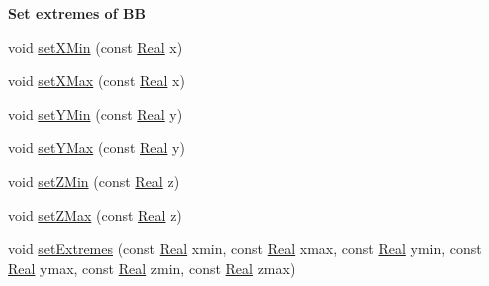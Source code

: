 \begin{Indent}{\bf Set extremes of BB}\par
\begin{DoxyCompactItemize}
\item 
void \hyperlink{classFVCode3D_1_1BoundingBox_a144cba8efab6a5aa39f70ec23e766d91}{set\+X\+Min} (const \hyperlink{namespaceFVCode3D_a40c1f5588a248569d80aa5f867080e83}{Real} x)
\item 
void \hyperlink{classFVCode3D_1_1BoundingBox_a78915347964e18dbc5e682a2f49e17c0}{set\+X\+Max} (const \hyperlink{namespaceFVCode3D_a40c1f5588a248569d80aa5f867080e83}{Real} x)
\item 
void \hyperlink{classFVCode3D_1_1BoundingBox_a737ffbfd6172701e115e4a09c4c2f794}{set\+Y\+Min} (const \hyperlink{namespaceFVCode3D_a40c1f5588a248569d80aa5f867080e83}{Real} y)
\item 
void \hyperlink{classFVCode3D_1_1BoundingBox_a6c94c8a20c124bbbbb930d674e9bbcee}{set\+Y\+Max} (const \hyperlink{namespaceFVCode3D_a40c1f5588a248569d80aa5f867080e83}{Real} y)
\item 
void \hyperlink{classFVCode3D_1_1BoundingBox_a0baed9e5d4512d22919cbe9758094c1a}{set\+Z\+Min} (const \hyperlink{namespaceFVCode3D_a40c1f5588a248569d80aa5f867080e83}{Real} z)
\item 
void \hyperlink{classFVCode3D_1_1BoundingBox_a3d1999833038d557cb89b56b35601593}{set\+Z\+Max} (const \hyperlink{namespaceFVCode3D_a40c1f5588a248569d80aa5f867080e83}{Real} z)
\item 
void \hyperlink{classFVCode3D_1_1BoundingBox_a8a1df0623c373b7a2c887e24d1fe298a}{set\+Extremes} (const \hyperlink{namespaceFVCode3D_a40c1f5588a248569d80aa5f867080e83}{Real} xmin, const \hyperlink{namespaceFVCode3D_a40c1f5588a248569d80aa5f867080e83}{Real} xmax, const \hyperlink{namespaceFVCode3D_a40c1f5588a248569d80aa5f867080e83}{Real} ymin, const \hyperlink{namespaceFVCode3D_a40c1f5588a248569d80aa5f867080e83}{Real} ymax, const \hyperlink{namespaceFVCode3D_a40c1f5588a248569d80aa5f867080e83}{Real} zmin, const \hyperlink{namespaceFVCode3D_a40c1f5588a248569d80aa5f867080e83}{Real} zmax)
\end{DoxyCompactItemize}
\end{Indent}
